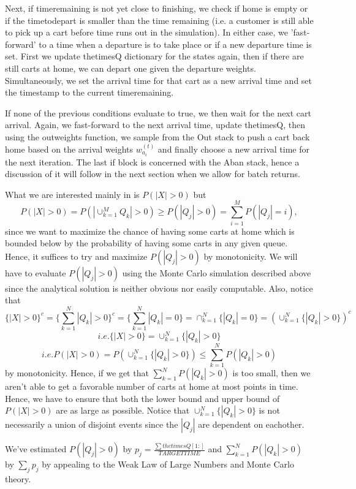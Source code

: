 \documentclass[english]{article}
\begin{document}
Next, if timeremaining is not yet close to finishing, we check if home is empty or if the timetodepart is smaller than the time remaining (i.e. a customer is still able to pick up a cart before time runs out in the simulation). In either case, we 'fast-forward' to a time when a departure is to take place or if a new departure time is set. First we update thetimesQ dictionary for the states again, then if there are still carts at home, we can depart one given the departure weights. Simultaneously, we set the arrival time for that cart as a new arrival time and set the timestamp to the current timeremaining.

If none of the previous conditions evaluate to true, we then wait for the next cart arrival. Again, we fast-forward to the next arrival time, update thetimesQ, then using the outweights function, we sample from the Out stack to push a cart back home based on the arrival weights $w_{a_i}^{(t)}$ and finally choose a new arrival time for the next iteration. The last if block is concerned with the Aban stack, hence a discussion of it will follow in the next section when we allow for batch returns.

What we are interested mainly in is $P(|X|>0)$ but
\[
P(|X|>0) = P(|\cup_{k=1}^{M}Q_k|>0) \geq P(|Q_j|>0) = \sum_{i=1}^{M}P(|Q_j|=i), 
\]
since we want to maximize the chance of having some carts at home which is bounded below by the probability of having some carts in any given queue. Hence, it suffices to try and maximize $P(|Q_j|>0)$ by monotonicity. We will have to evaluate $P(|Q_j|>0)$ using the Monte Carlo simulation described above since the analytical solution is neither obvious nor easily computable.
Also, notice that 
\[
\{|X|>0 \}^{c} = \{\sum_{k=1}^{N}|Q_k|>0 \}^{c} = \{\sum_{k=1}^{N}|Q_k|=0 \} = \cap_{k=1}^{N}\{|Q_k|=0 \} = (\cup_{k=1}^{N}\{|Q_k|>0 \})^{c}
\]
\[
i.e. \{|X|>0 \} = \cup_{k=1}^{N}\{|Q_k|>0 \}
\]
\[
 i.e.  P(|X|>0) = P(\cup_{k=1}^{N}\{|Q_k|>0 \}) \leq \sum_{k=1}^{N}P(|Q_k|>0)
\]
by monotonicity. Hence, if we get that $\sum_{k=1}^{N}P(|Q_k|>0)$ is too small, then we aren't able to get a favorable number of carts at home at most points in time. Hence, we have to ensure that both the lower bound and upper bound of $P(|X|>0)$ are as large as possible. Notice that $\cup_{k=1}^{N}\{|Q_k|>0 \}$ is not necessarily a union of disjoint events since the $|Q_j|$ are dependent on eachother. 

We've estimated $P(|Q_j|>0)$ by $p_j=\frac{\sum thetimesQ[1:]}{TARGETTIME}$  and $\sum_{k=1}^{N}P(|Q_k|>0)$ by $\sum_j p_j$ by appealing to the Weak Law of Large Numbers and Monte Carlo theory.
\end{document}
